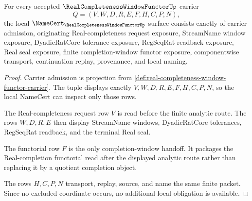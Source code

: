\begin{theorem}
\label{thm:real-completeness-window-functor-namecert-obligations}
For every accepted $\RealCompletenessWindowFunctorUp$ carrier
$$
Q=(V,W,D,R,E,F,H,C,P,N),
$$
the local $\NameCert_{\RealCompletenessWindowFunctorUp}$ surface consists exactly of carrier admission, originating Real-completeness request exposure, StreamName window exposure, DyadicRatCore tolerance exposure, RegSeqRat readback exposure, Real seal exposure, finite completion-window functor exposure, componentwise transport, continuation replay, provenance, and local naming.
\end{theorem}
\begin{proof}
Carrier admission is projection from \autoref{def:real-completeness-window-functor-carrier}. The tuple displays exactly $V,W,D,R,E,F,H,C,P,N$, so the local NameCert can inspect only those rows.

The Real-completeness request row $V$ is read before the finite analytic route. The rows $W,D,R,E$ then display StreamName windows, DyadicRatCore tolerances, RegSeqRat readback, and the terminal Real seal.

The functorial row $F$ is the only completion-window handoff. It packages the Real-completion functorial read after the displayed analytic route rather than replacing it by a quotient completion object.

The rows $H,C,P,N$ transport, replay, source, and name the same finite packet. Since no excluded coordinate occurs, no additional local obligation is available.
\end{proof}




